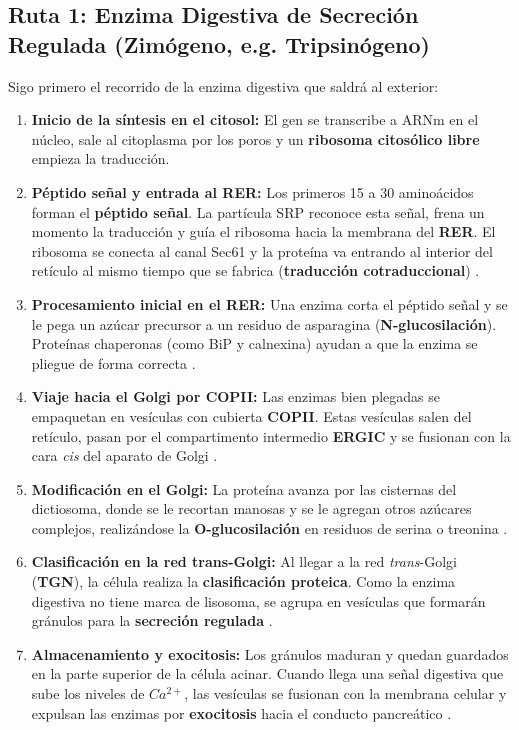 \documentclass[spanish,letterpaper,oneside]{article}
\begin{document}
\subsection{Ruta 1: Enzima Digestiva de Secreción Regulada (Zimógeno, e.g. Tripsinógeno)}
Sigo primero el recorrido de la enzima digestiva que saldrá al exterior:
\begin{enumerate}
    \item \textbf{Inicio de la síntesis en el citosol:} El gen se transcribe a ARNm en el núcleo, sale al citoplasma por los poros y un \textbf{ribosoma citosólico libre} empieza la traducción.
    \item \textbf{Péptido señal y entrada al RER:} Los primeros 15 a 30 aminoácidos forman el \textbf{péptido señal}. La partícula SRP reconoce esta señal, frena un momento la traducción y guía el ribosoma hacia la membrana del \textbf{RER}. El ribosoma se conecta al canal Sec61 y la proteína va entrando al interior del retículo al mismo tiempo que se fabrica (\textbf{traducción cotraduccional}) \parencite{salazar2018biologia, alberts2022molecular}.
    \item \textbf{Procesamiento inicial en el RER:} Una enzima corta el péptido señal y se le pega un azúcar precursor a un residuo de asparagina (\textbf{N-glucosilación}). Proteínas chaperonas (como BiP y calnexina) ayudan a que la enzima se pliegue de forma correcta \parencite{mathews2013bioquimica}.
    \item \textbf{Viaje hacia el Golgi por COPII:} Las enzimas bien plegadas se empaquetan en vesículas con cubierta \textbf{COPII}. Estas vesículas salen del retículo, pasan por el compartimento intermedio \textbf{ERGIC} y se fusionan con la cara \textit{cis} del aparato de Golgi \parencite{fortoul2020histologia, lodish2021molecular}.
    \item \textbf{Modificación en el Golgi:} La proteína avanza por las cisternas del dictiosoma, donde se le recortan manosas y se le agregan otros azúcares complejos, realizándose la \textbf{O-glucosilación} en residuos de serina o treonina \parencite{mathews2013bioquimica, kierszenbaum2020histologia}.
    \item \textbf{Clasificación en la red trans-Golgi:} Al llegar a la red \textit{trans}-Golgi (\textbf{TGN}), la célula realiza la \textbf{clasificación proteica}. Como la enzima digestiva no tiene marca de lisosoma, se agrupa en vesículas que formarán gránulos para la \textbf{secreción regulada} \parencite{alberts2022molecular}.
    \item \textbf{Almacenamiento y exocitosis:} Los gránulos maduran y quedan guardados en la parte superior de la célula acinar. Cuando llega una señal digestiva que sube los niveles de $Ca^{2+}$, las vesículas se fusionan con la membrana celular y expulsan las enzimas por \textbf{exocitosis} hacia el conducto pancreático \parencite{kierszenbaum2020histologia, karp2019biologia}.
\end{enumerate}
\end{document}
